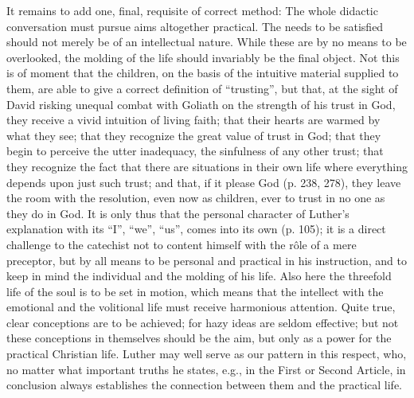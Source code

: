 It remains to add one, final, requisite of correct method: The whole didactic conversation must pursue aims altogether practical. The needs to be satisfied should not merely be of an intellectual nature. While these are by no means to be overlooked, the molding of the life should invariably be the final object. Not this is of moment that the children, on the basis of the intuitive material supplied to them, are able to give a correct definition of “trusting”, but that, at the sight of David risking unequal combat with Goliath on the strength of his trust in God, they receive a vivid intuition of living faith; that their hearts are warmed by what they see; that they recognize the great value of trust in God; that they begin to perceive the utter inadequacy, the sinfulness of any other trust; that they recognize the fact that there are situations in their own life where everything depends upon just such trust; and that, if it please God
(p. 238, 278), they leave the room with the resolution, even now as children, ever to trust in no one as they do in God. It is only thus that the personal character of Luther’s explanation with its “I”, “we”, “us”, comes into its own (p. 105); it is a direct challenge to the catechist not to content himself with the rôle of a mere preceptor, but by all means to be personal and practical in his instruction, and to keep in mind the individual and the molding of his life. Also here the threefold life of the soul is to be set in motion, which means that the intellect with the emotional and the volitional life must receive harmonious attention. Quite true, clear conceptions are to be achieved; for hazy ideas are seldom effective; but not these conceptions in themselves should be the aim, but only as a power for the practical Christian life. Luther may well serve as our pattern in this respect, who, no matter what important truths he states, e.g., in the First or Second Article, in conclusion always establishes the connection between them and the practical life.

